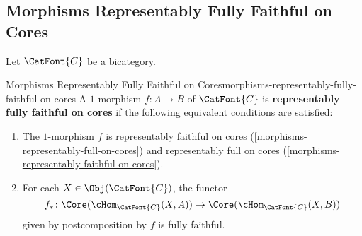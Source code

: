 \subsection{Morphisms Representably Fully Faithful on Cores}\label{subsection-morphisms-representably-fully-faithful-on-cores}
Let $\CatFont{C}$ be a bicategory.
\begin{definition}{Morphisms Representably Fully Faithful on Cores}{morphisms-representably-fully-faithful-on-cores}%
    A $1$-morphism $f\colon A\to B$ of $\CatFont{C}$ is \textbf{representably fully faithful on cores} if the following equivalent conditions are satisfied:
    \begin{enumerate}
        \item\label{morphisms-representably-fully-faithful-on-cores-1}The $1$-morphism $f$ is representably faithful on cores (\cref{morphisms-representably-full-on-cores}) and representably full on cores (\cref{morphisms-representably-faithful-on-cores}).
        \item\label{morphisms-representably-fully-faithful-on-cores-2}For each $X\in\Obj(\CatFont{C})$, the functor
            \[
                f_{*}%
                \colon%
                \Core(\cHom_{\CatFont{C}}(X,A))%
                \to%
                \Core(\cHom_{\CatFont{C}}(X,B))%
            \]%
            given by postcomposition by $f$ is fully faithful.
    \end{enumerate}
\end{definition}
